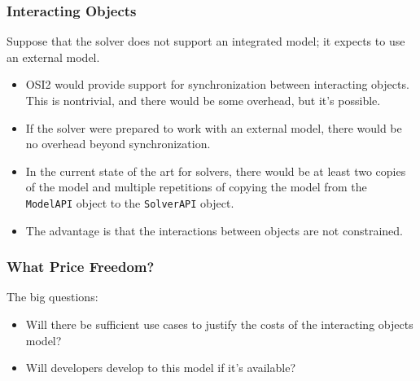 \documentclass{beamer}
\begin{document}
\begin{frame}
  \frametitle{Interacting Objects}

  Suppose that the solver does not support an integrated model; it expects to
  use an external model.
  \begin{itemize}
  \item OSI2 would provide support for synchronization between
    interacting objects. This is nontrivial, and there would be some
    overhead, but it's possible.
  \item If the solver were prepared to work with an external model,
    there would be no overhead beyond synchronization.
  \item In the current state of the art for solvers, there would be
    at least two copies of the model and multiple repetitions of
    copying the model from the \lstinline|ModelAPI| object to the
    \lstinline|SolverAPI| object.
  \item The advantage is that the interactions between objects are
    not constrained.
\end{itemize}
\end{frame}

\begin{frame}
  \frametitle{What Price Freedom?}

  The big questions:
  \begin{itemize}
  \item Will there be sufficient use cases to justify the costs of
    the interacting objects model?
  \item Will developers develop to this model if it's available?
  \end{itemize}
\end{frame}
\end{document}
